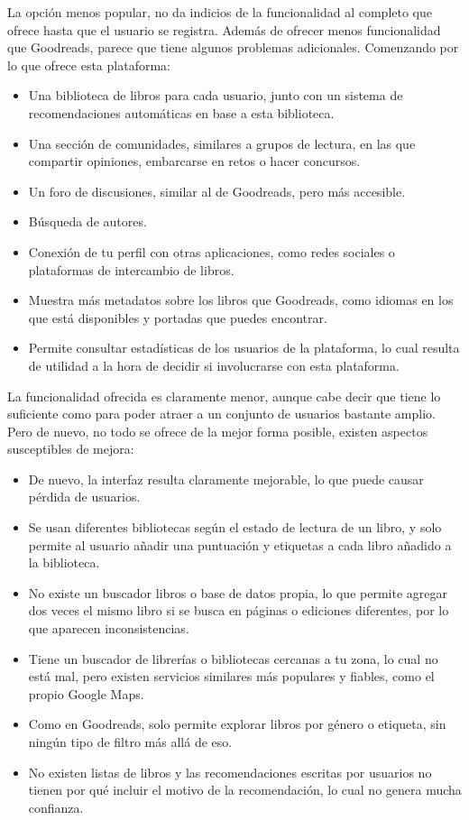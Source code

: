 La opción menos popular, no da indicios de la funcionalidad al completo que ofrece hasta que el usuario se registra. Además de ofrecer menos funcionalidad que Goodreads, parece que tiene algunos problemas adicionales. Comenzando por lo que ofrece esta plataforma:

\begin{itemize}
\item Una biblioteca de libros para cada usuario, junto con un sistema de recomendaciones automáticas en base a esta biblioteca.
\item Una sección de comunidades, similares a grupos de lectura, en las que compartir opiniones, embarcarse en retos o hacer concursos.
\item Un foro de discusiones, similar al de Goodreads, pero más accesible.
\item Búsqueda de autores.
\item Conexión de tu perfil con otras aplicaciones, como redes sociales o plataformas de intercambio de libros.
\item Muestra más metadatos sobre los libros que Goodreads, como idiomas en los que está disponibles y portadas que puedes encontrar.
\item Permite consultar estadísticas de los usuarios de la plataforma, lo cual resulta de utilidad a la hora de decidir si involucrarse con esta plataforma.
\end{itemize}

La funcionalidad ofrecida es claramente menor, aunque cabe decir que tiene lo suficiente como para poder atraer a un conjunto de usuarios bastante amplio. Pero de nuevo, no todo se ofrece de la mejor forma posible, existen aspectos susceptibles de mejora:

\begin{itemize}
\item De nuevo, la interfaz resulta claramente mejorable, lo que puede causar pérdida de usuarios.
\item Se usan diferentes bibliotecas según el estado de lectura de un libro, y solo permite al usuario añadir una puntuación y etiquetas a cada libro añadido a la biblioteca.
\item No existe un buscador libros o base de datos propia, lo que permite agregar dos veces el mismo libro si se busca en páginas o ediciones diferentes, por lo que aparecen inconsistencias.
\item Tiene un buscador de librerías o bibliotecas cercanas a tu zona, lo cual no está mal, pero existen servicios similares más populares y fiables, como el propio Google Maps.
\item Como en Goodreads, solo permite explorar libros por género o etiqueta, sin ningún tipo de filtro más allá de eso.
\item No existen listas de libros y las recomendaciones escritas por usuarios no tienen por qué incluir el motivo de la recomendación, lo cual no genera mucha confianza.
\end{itemize}

